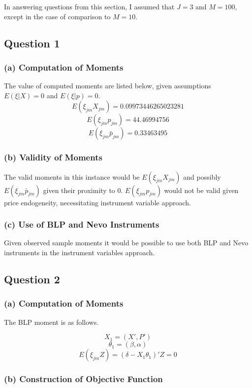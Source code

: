 \documentclass{article}
\begin{document}
In answering questions from this section, I assumed that $J=3$ and $M=100$, except in the case of comparison to $M=10$.

\subsection{Question 1}

\subsubsection{(a) Computation of Moments}

The value of computed moments are listed below, given assumptions $E(\xi|X)=0$ and $E(\xi|p)=0$.
$$E(\xi_{jm}X_{jm})=0.09973446265023281$$
$$E(\xi_{jm}p_{jm})=44.46994756$$
$$E(\xi_{jm}\bar{p}_{jm})=0.33463495$$

\subsubsection{(b) Validity of Moments}

The valid moments in this instance would be $E(\xi_{jm}X_{jm})$ and possibly $E(\xi_{jm}\bar{p}_{jm})$ given their proximity to 0. $E(\xi_{jm}p_{jm})$ would not be valid given price endogeneity, necessitating instrument variable approach.

\subsubsection{(c) Use of BLP and Nevo Instruments}

Given observed sample moments it would be possible to use both BLP and Nevo instruments in the instrument variables approach.

\subsection{Question 2}

\subsubsection{(a) Computation of Moments}

The BLP moment is as follows.

$$X_1=(X', P')$$
$$\theta_1=(\beta, \alpha)$$
$$E(\xi_{jm} Z)=( \delta - X_1 \theta_1 )'Z=0$$

\subsubsection{(b) Construction of Objective Function}
\end{document}
